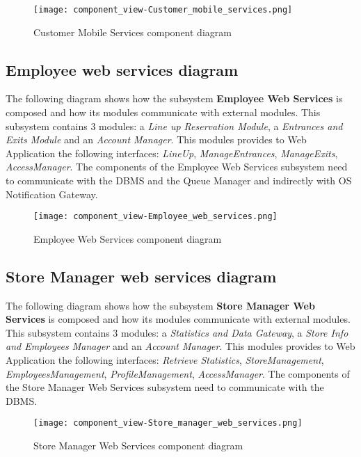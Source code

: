     \begin{figure}[H]
        \centering
        \texttt{[image: component\_view-Customer\_mobile\_services.png]}
        \caption{Customer Mobile Services component diagram}
    \end{figure}

\subsection{Employee web services diagram}

    The following diagram shows how the subsystem \textbf{Employee Web Services} is composed and how its modules communicate with external modules. This subsystem contains 3 modules: a \textit{Line up Reservation Module}, a \textit{Entrances and Exits Module} and an \textit{Account Manager}. This modules provides to Web Application the following interfaces: \textit{LineUp}, \textit{ManageEntrances}, \textit{ManageExits}, \textit{AccessManager}. The components of the Employee Web Services subsystem need to communicate with the DBMS and the Queue Manager and indirectly with OS Notification Gateway.

    \begin{figure}[H]
        \centering
        \texttt{[image: component\_view-Employee\_web\_services.png]}
        \caption{Employee Web Services component diagram}
    \end{figure}

\subsection{Store Manager web services diagram}

    The following diagram shows how the subsystem \textbf{Store Manager Web Services} is composed and how its modules communicate with external modules. This subsystem contains 3 modules: a \textit{Statistics and Data Gateway}, a \textit{Store Info and Employees Manager} and an \textit{Account Manager}. This modules provides to Web Application the following interfaces: \textit{Retrieve Statistics}, \textit{StoreManagement}, \textit{EmployeesManagement}, \textit{ProfileManagement}, \textit{AccessManager}. The components of the Store Manager Web Services subsystem need to communicate with the DBMS.

    \begin{figure}[H]
        \centering
        \texttt{[image: component\_view-Store\_manager\_web\_services.png]}
        \caption{Store Manager Web Services component diagram}
    \end{figure}